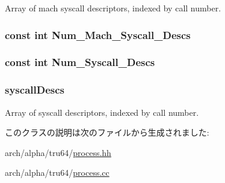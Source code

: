 Array of mach syscall descriptors, indexed by call number. \hypertarget{classAlphaISA_1_1AlphaTru64Process_a268ff6f294759681a7cbaa847d129e15}{
\subsubsection[{Num\_\-Mach\_\-Syscall\_\-Descs}]{\setlength{\rightskip}{0pt plus 5cm}const int {\bf Num\_\-Mach\_\-Syscall\_\-Descs}}}
\label{classAlphaISA_1_1AlphaTru64Process_a268ff6f294759681a7cbaa847d129e15}
\hypertarget{classAlphaISA_1_1AlphaTru64Process_a9534988905c6f5c8c57c4b6a7b179fea}{
\subsubsection[{Num\_\-Syscall\_\-Descs}]{\setlength{\rightskip}{0pt plus 5cm}const int {\bf Num\_\-Syscall\_\-Descs}}}
\label{classAlphaISA_1_1AlphaTru64Process_a9534988905c6f5c8c57c4b6a7b179fea}
\hypertarget{classAlphaISA_1_1AlphaTru64Process_a08d67a94820b75842e07f030e548372e}{
\subsubsection[{syscallDescs}]{ {\bf syscallDescs}}}
\label{classAlphaISA_1_1AlphaTru64Process_a08d67a94820b75842e07f030e548372e}


Array of syscall descriptors, indexed by call number. 

このクラスの説明は次のファイルから生成されました:\begin{DoxyCompactItemize}
\item 
arch/alpha/tru64/\hyperlink{arch_2alpha_2tru64_2process_8hh}{process.hh}\item 
arch/alpha/tru64/\hyperlink{arch_2alpha_2tru64_2process_8cc}{process.cc}\end{DoxyCompactItemize}
